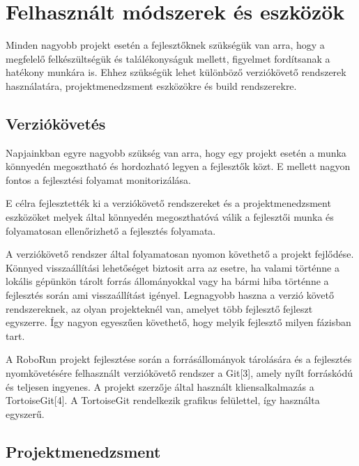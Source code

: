 \chapter{Felhasznált módszerek és eszközök}\label{ch:diszkr}

\begin{osszefoglal}
	Minden nagyobb projekt esetén a fejlesztőknek szükségük van arra, hogy a megfelelő felkészültségük és találékonyságuk mellett, figyelmet fordítsanak a hatékony munkára is. Ehhez szükségük lehet különböző verziókövető rendszerek használatára, projektmenedzsment eszközökre és build rendszerekre.
\end{osszefoglal}


\section{Verziókövetés}

Napjainkban egyre nagyobb szükség van arra, hogy egy projekt esetén a munka könnyedén megosztható és hordozható legyen a fejlesztők közt. E mellett nagyon fontos a fejlesztési folyamat monitorizálása.

	E célra fejlesztették  ki a verziókövető rendszereket és a projektmenedzsment eszközöket melyek által könnyedén megoszthatóvá válik a fejlesztői munka és folyamatosan ellenőrizhető a fejlesztés folyamata.  
	
	A verziókövető rendszer által  folyamatosan nyomon követhető a projekt fejlődése. Könnyed visszaállítási lehetőséget biztosit arra az esetre, ha valami történne a lokális gépünkön tárolt forrás állományokkal vagy ha bármi hiba történne a fejlesztés során ami visszaállítást igényel. Legnagyobb haszna a verzió követő rendszereknek, az olyan projekteknél van, amelyet több fejlesztő fejleszt egyszerre. Így nagyon egyeszűen követhető, hogy melyik fejlesztő milyen fázisban tart.
	
	A RoboRun projekt fejlesztése során a forrásállományok tárolására és a fejlesztés nyomkövetésére felhasznált verziókövető rendszer a Git[3], amely nyílt forráskódú és teljesen ingyenes. A projekt szerzője által használt kliensalkalmazás a  TortoiseGit[4]. A TortoiseGit rendelkezik grafikus felülettel, így használta egyszerű. 

\section{Projektmenedzsment}

